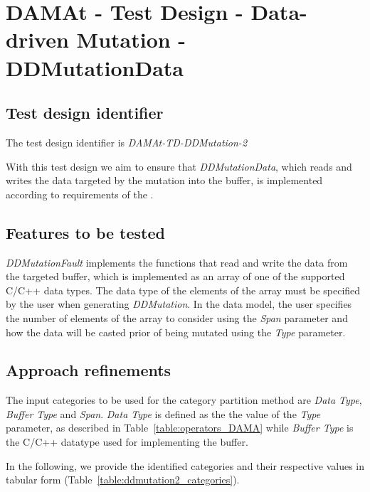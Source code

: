 \section{DAMAt - Test Design - Data-driven Mutation - DDMutationData}

\subsection{Test design identifier}
%
The test design identifier is \emph{DAMAt-TD-DDMutation-2}

With this test design we aim to ensure that \emph{DDMutationData}, which reads and writes the data targeted by the mutation into the buffer, is implemented according to requirements of the \FAQAS.
%
\subsection{Features to be tested}

\emph{DDMutationFault} implements the functions that read and write the data from the targeted buffer, which is implemented as an array of one of the supported C/C++ data types.
The data type of the elements of the array must be specified by the user when generating \emph{DDMutation}.
In the data model, the user specifies the number of elements of the array to consider using the \emph{Span} parameter and how the data will be casted prior of being mutated using the \emph{Type} parameter.


\subsection{Approach refinements}
%
The input categories to be used for the category partition method are \emph{Data Type}, \emph{Buffer Type} and \emph{Span}.
\emph{Data Type} is defined as the the value of the \emph{Type} parameter, as described in Table~\ref{table:operators_DAMA} while \emph{Buffer Type} is the C/C++ datatype used for implementing the buffer.

In the following, we provide the identified categories and their respective values in tabular form (Table~\ref{table:ddmutation2_categories}).


